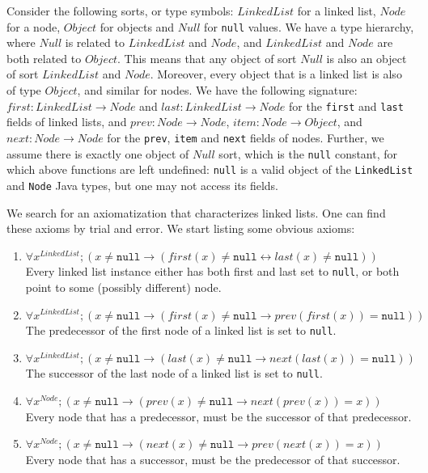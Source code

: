 \documentclass[runningheads]{llncs}
\begin{document}
Consider the following sorts, or type symbols: $\mathit{LinkedList}$ for a linked list, $\mathit{Node}$ for a node, $\mathit{Object}$ for objects and $\mathit{Null}$ for \texttt{null} values. We have a type hierarchy, where $\mathit{Null}$ is related to $\mathit{LinkedList}$ and $\mathit{Node}$, and $\mathit{LinkedList}$ and $\mathit{Node}$ are both related to $\mathit{Object}$. This means that any object of sort $\mathit{Null}$ is also an object of sort $\mathit{LinkedList}$ and $\mathit{Node}$. Moreover, every object that is a linked list is also of type $\mathit{Object}$, and similar for nodes.
We have the following signature: $\mathit{first}: \mathit{LinkedList}\to \mathit{Node}$ and $\mathit{last}: \mathit{LinkedList}\to \mathit{Node}$ for the \texttt{first} and \texttt{last} fields of linked lists, and $\mathit{prev}: \mathit{Node}\to \mathit{Node}$, $\mathit{item}: \mathit{Node}\to \mathit{Object}$, and $\mathit{next}: \mathit{Node}\to \mathit{Node}$ for the \texttt{prev}, \texttt{item} and \texttt{next} fields of nodes. Further, we assume there is exactly one object of $\mathit{Null}$ sort, which is the \texttt{null} constant, for which above functions are left undefined: \texttt{null} is a valid object of the \texttt{LinkedList} and \texttt{Node} Java types, but one may not access its fields.

We search for an axiomatization that characterizes linked lists. One can find these axioms by trial and error. We start listing some obvious axioms:

\begin{enumerate}
    \item $\forall x^\mathit{LinkedList}; (x \neq \mathtt{null} \to (\mathit{first}(x) \neq \mathtt{null} \leftrightarrow \mathit{last}(x) \neq \mathtt{null}))$\\
    Every linked list instance either has both first and last set to \texttt{null}, or both point to some (possibly different) node.
    \item $\forall x^\mathit{LinkedList}; (x \neq \mathtt{null} \to (\mathit{first}(x) \neq \mathtt{null} \to \mathit{prev}(\mathit{first}(x)) = \mathtt{null}))$\\
    The predecessor of the first node of a linked list is set to \texttt{null}.
    \item $\forall x^\mathit{LinkedList}; (x \neq \mathtt{null} \to (\mathit{last}(x) \neq \mathtt{null} \to \mathit{next}(\mathit{last}(x)) = \mathtt{null}))$\\
    The successor of the last node of a linked list is set to \texttt{null}.
    \item\label{item:axiom-pred} $\forall x^\mathit{Node}; (x \neq \mathtt{null} \to (\mathit{prev}(x) \neq \mathtt{null} \to \mathit{next}(\mathit{prev}(x)) = x))$\\
    Every node that has a predecessor, must be the successor of that predecessor.
    \item\label{item:axiom-succ} $\forall x^\mathit{Node}; (x \neq \mathtt{null} \to (\mathit{next}(x) \neq \mathtt{null} \to \mathit{prev}(\mathit{next}(x)) = x))$\\
    Every node that has a successor, must be the predecessor of that successor.
\end{enumerate}
\end{document}
